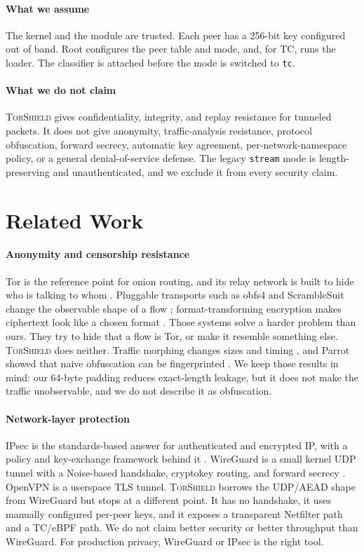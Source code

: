 \documentclass[conference]{IEEEtran}
\newcommand{\sys}{\textsc{TorShield}}
\newcommand{\code}[1]{\texttt{#1}}
\begin{document}
\paragraph{What we assume}
The kernel and the module are trusted. Each peer has a 256-bit key configured out of band. Root configures the peer table and mode, and, for TC, runs the loader. The classifier is attached before the mode is switched to \code{tc}.

\paragraph{What we do not claim}
\sys{} gives confidentiality, integrity, and replay resistance for tunneled packets. It does not give anonymity, traffic-analysis resistance, protocol obfuscation, forward secrecy, automatic key agreement, per-network-namespace policy, or a general denial-of-service defense. The legacy \code{stream} mode is length-preserving and unauthenticated, and we exclude it from every security claim.

\section{Related Work}

\paragraph{Anonymity and censorship resistance}
Tor is the reference point for onion routing, and its relay network is built to hide who is talking to whom \cite{dingledine2004tor}. Pluggable transports such as obfs4 and ScrambleSuit change the observable shape of a flow \cite{obfs4,winter2013scramblesuit}; format-transforming encryption makes ciphertext look like a chosen format \cite{dyer2013fte}. Those systems solve a harder problem than ours. They try to hide that a flow is Tor, or make it resemble something else. \sys{} does neither. Traffic morphing changes sizes and timing \cite{wright2009morphing}, and Parrot showed that naive obfuscation can be fingerprinted \cite{houmansadr2013parrot}. We keep those results in mind: our 64-byte padding reduces exact-length leakage, but it does not make the traffic unobservable, and we do not describe it as obfuscation.

\paragraph{Network-layer protection}
IPsec is the standards-based answer for authenticated and encrypted IP, with a policy and key-exchange framework behind it \cite{kent2005ipsec}. WireGuard is a small kernel UDP tunnel with a Noise-based handshake, cryptokey routing, and forward secrecy \cite{donenfeld2017wireguard}. OpenVPN is a userspace TLS tunnel. \sys{} borrows the UDP/AEAD shape from WireGuard but stops at a different point. It has no handshake, it uses manually configured per-peer keys, and it exposes a transparent Netfilter path and a TC/eBPF path. We do not claim better security or better throughput than WireGuard. For production privacy, WireGuard or IPsec is the right tool.
\end{document}
